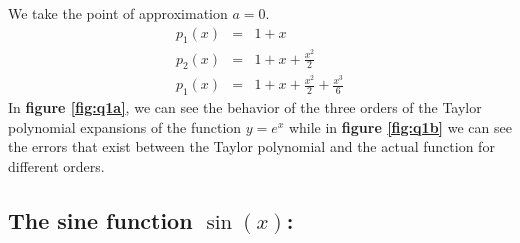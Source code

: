 \documentclass[12,a4paper]{article}
\begin{document}
    We take the point of approximation $a = 0$.
    \begin{eqnarray}
        p_1(x) &=& 1 + x \nonumber \\
        p_2(x) &=& 1 + x + \frac{x^2}{2} \nonumber \\
        p_1(x) &=& 1 + x + \frac{x^2}{2} + \frac{x^3}{6} \nonumber
    \end{eqnarray}
    In \textbf{figure \ref{fig:q1a}}, we can see the behavior of the three orders of the Taylor polynomial expansions of the function $y=e^x$ while in \textbf{figure \ref{fig:q1b}} we can see the errors that exist between the Taylor polynomial and the actual function for different orders.
    \subsection{The sine function $\sin(x)$:}
\end{document}
